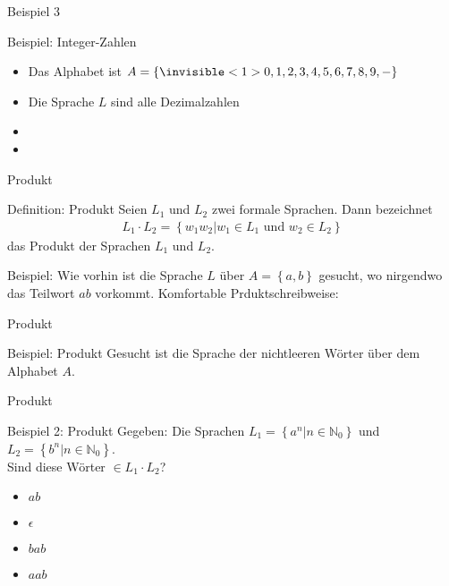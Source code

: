 \begin{frame}{Beispiel 3}
    \begin{block}{Beispiel: Integer-Zahlen}
        \begin{itemize}
            \item Das Alphabet ist $A = \left\{\invisible<1>{ 0, 1, 2, 3, 4, 5, 6, 7, 8, 9, - }\right\}$
                \pause
            \item Die Sprache $L$ sind alle Dezimalzahlen
                \pause
            \item {}
                \pause
            \item {}
        \end{itemize}
    \end{block}
\end{frame}

\begin{frame}{Produkt}
    \begin{block}{Definition: Produkt}
        Seien $L_1$ und $L_2$ zwei formale Sprachen. Dann bezeichnet
        \begin{align*}
            L_1 \cdot L_2 = \left\{ w_1 w_2 | w_1 \in L_1 \text{\ und } w_2 \in L_2 \right\}
        \end{align*}
        das Produkt der Sprachen $L_1$ und $L_2$.
    \end{block}
    \begin{exampleblock}{Beispiel:}
        Wie vorhin ist die Sprache $L$ über $A = \left\{ a, b\right\}$ gesucht, wo nirgendwo das Teilwort $ab$ vorkommt. Komfortable Prduktschreibweise:
        \pause
    \end{exampleblock}
\end{frame}
\begin{frame}{Produkt}
    \begin{exampleblock}{Beispiel: Produkt}
        Gesucht ist die Sprache der nichtleeren Wörter über dem Alphabet $A$.
        \pause
    \end{exampleblock}
\end{frame}
\begin{frame}{Produkt}
    \begin{exampleblock}{Beispiel 2: Produkt}
        Gegeben: Die Sprachen $L_1 = \left\{ a^n | n \in \mathbb{N}_0\right\}$ und $ L_2 = \left\{ b^n | n \in \mathbb{N}_0 \right\}$.\\
        Sind diese Wörter $\in L_1 \cdot L_2$?
        \begin{itemize}
            \item $ab$
                \pause
            \item $\epsilon$
                \pause
            \item $bab$
                \pause
            \item $aab$
                \pause
        \end{itemize}
    \end{exampleblock}
\end{frame}

